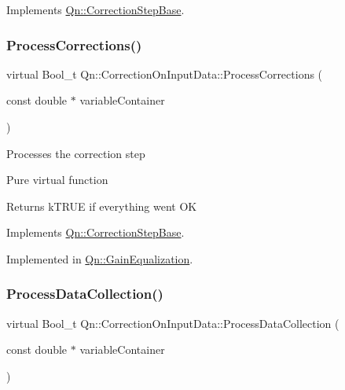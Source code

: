 Implements \mbox{\hyperlink{classQn_1_1CorrectionStepBase_aa99ab21886c2b4d8c3c6e1f60b84acc9}{Qn\+::\+Correction\+Step\+Base}}.

\mbox{\label{classQn_1_1CorrectionOnInputData_a42390a6c47f558faeb1e14d245dcbc4a}} 
\subsubsection{\texorpdfstring{Process\+Corrections()}{ProcessCorrections()}}
{\footnotesize\ttfamily virtual Bool\+\_\+t Qn\+::\+Correction\+On\+Input\+Data\+::\+Process\+Corrections (\begin{DoxyParamCaption}\item[{const double $\ast$}]{variable\+Container }\end{DoxyParamCaption})\hspace{0.3cm}{\ttfamily [pure virtual]}}

Processes the correction step

Pure virtual function \begin{DoxyReturn}{Returns}
k\+T\+R\+UE if everything went OK 
\end{DoxyReturn}


Implements \mbox{\hyperlink{classQn_1_1CorrectionStepBase_a773ff3bbe5e7c8bcfb11a4f4138af1e1}{Qn\+::\+Correction\+Step\+Base}}.



Implemented in \mbox{\hyperlink{classQn_1_1GainEqualization_ade22bc9b3aee596b6594d8a8d6fdc1f1}{Qn\+::\+Gain\+Equalization}}.

\mbox{\label{classQn_1_1CorrectionOnInputData_aff000eb0dbd571ac42eb0c4d3771ba69}} 
\subsubsection{\texorpdfstring{Process\+Data\+Collection()}{ProcessDataCollection()}}
{\footnotesize\ttfamily virtual Bool\+\_\+t Qn\+::\+Correction\+On\+Input\+Data\+::\+Process\+Data\+Collection (\begin{DoxyParamCaption}\item[{const double $\ast$}]{variable\+Container }\end{DoxyParamCaption})\hspace{0.3cm}{\ttfamily [pure virtual]}}

